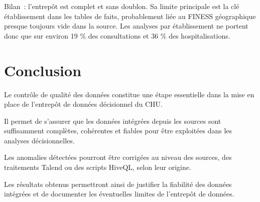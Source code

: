 \noindent Bilan~: l'entrepôt est complet et sans doublon. Sa limite principale est la clé établissement dans les tables de faits, probablement liée au FINESS géographique presque toujours vide dans la source. Les analyses par établissement ne portent donc que sur environ 19 \% des consultations et 36 \% des hospitalisations.


\section{Conclusion}

\noindent Le contrôle de qualité des données constitue une étape essentielle dans la mise en place de l'entrepôt de données décisionnel du CHU.

\noindent Il permet de s'assurer que les données intégrées depuis les sources sont suffisamment complètes, cohérentes et fiables pour être exploitées dans les analyses décisionnelles.

\noindent Les anomalies détectées pourront être corrigées au niveau des sources, des traitements Talend ou des scripts HiveQL, selon leur origine.

\noindent Les résultats obtenus permettront ainsi de justifier la fiabilité des données intégrées et de documenter les éventuelles limites de l'entrepôt de données.
